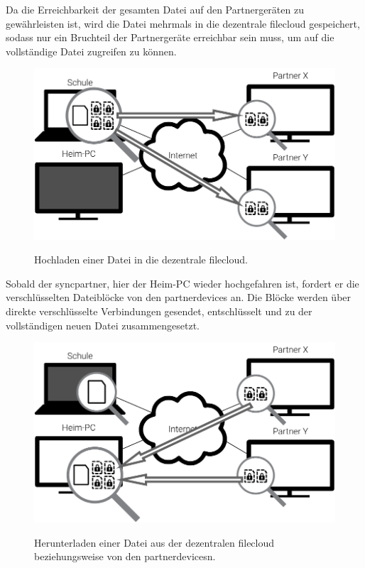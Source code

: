 Da die Erreichbarkeit der gesamten Datei auf den Partnergeräten zu gewährleisten
ist, wird die Datei mehrmals
in die dezentrale \gls{filecloud} gespeichert, sodass nur ein Bruchteil der
Partnergeräte erreichbar sein muss, um auf die vollständige Datei zugreifen zu
können.

\begin{figure}[H]
	\centering
  \includegraphics[]{images/sblit_upload}
	\label{sblit_upload}
  \caption{Hochladen einer Datei in die dezentrale \gls{filecloud}.}
\end{figure}

Sobald der \gls{syncpartner}, hier der Heim-PC wieder hochgefahren ist, fordert er die
verschlüsselten Dateiblöcke von den \glspl{partnerdevice} an. Die Blöcke werden über
direkte verschlüsselte Verbindungen gesendet, entschlüsselt und zu der
vollständigen neuen Datei zusammengesetzt.


\begin{figure}[H]
	\centering
  \includegraphics[]{images/sblit_download}
	\label{sblit_download}
  \caption{Herunterladen einer Datei aus der dezentralen \gls{filecloud} beziehungsweise
	von den \glspl{partnerdevice}n.}
\end{figure}
